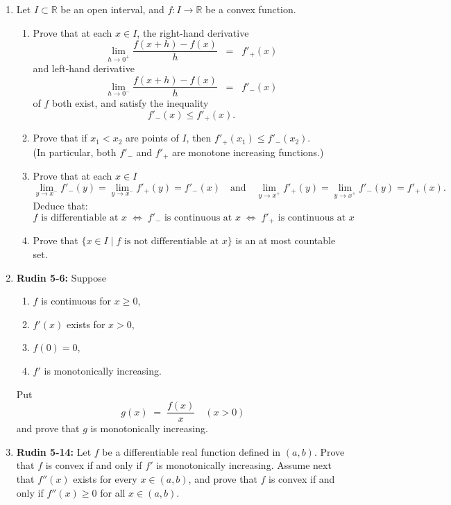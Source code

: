 \documentclass[11pt]{article}
\newcommand{\R}{\mathbb{R}}
\begin{document}
  \begin{enumerate}
    \item Let \(I \subset \R\) be an open interval, and \(f \colon I \to \R\) be a convex function.
      \begin{enumerate}
        \item Prove that at each \(x \in I\), the right-hand derivative 
          \[\lim_{h \to 0^+} \frac{f(x+h) - f(x)}{h} \;\;=\;\; f'_+(x)\]
          and left-hand derivative
          \[\lim_{h \to 0^-} \frac{f(x+h) - f(x)}{h} \;\;=\;\; f'_-(x)\]
          of \(f\) both exist, and satisfy the inequality \[f'_-(x) \leq f'_+(x).\]

        \item Prove that if \(x_1 < x_2\) are points of \(I\), then \(f'_+(x_1) \leq f'_-(x_2)\). \\
          (In particular, both \(f'_-\) and \(f'_+\) are monotone increasing functions.)

        \item Prove that at each \(x \in I\)
          \[\lim_{y \to x^-} f'_-(y) = \lim_{y \to x^-} f'_+(y) = f'_-(x) \quad \text{and} \quad
          \lim_{y \to x^+} f'_+(y) = \lim_{y \to x^+} f'_-(y) = f'_+(x).\]
          Deduce that:
          \[f \text{ is differentiable at } x \;\iff\; f'_- \text{ is continuous at } x \;\iff\;
          f'_+ \text{ is continuous at } x\]

        \item Prove that \(\{x \in I \mid f \text{ is not differentiable at } x\}\) is an at most countable 
          set.
      \end{enumerate}
      \newpage

    \item \textbf{Rudin 5-6:} Suppose
      \begin{enumerate}
        \item \(f\) is continuous for \(x \geq 0\),
        \item \(f'(x)\) exists for \(x > 0\),
        \item \(f(0) = 0\),
        \item \(f'\) is monotonically increasing.
      \end{enumerate}
      Put \[g(x) \;=\; \frac{f(x)}{x} \quad (x > 0)\]
      and prove that \(g\) is monotonically increasing.
      \newpage

    \item \textbf{Rudin 5-14:} Let \(f\) be a differentiable real function defined in \((a,b)\).  Prove that 
      \(f\) is convex if and only if \(f'\) is monotonically increasing.  Assume next that \(f''(x)\) exists 
      for every \(x \in (a,b)\), and prove that \(f\) is convex if and only if \(f''(x) \geq 0\) for all 
      \(x \in (a,b)\).
      \newpage


\end{enumerate}
\end{document}
